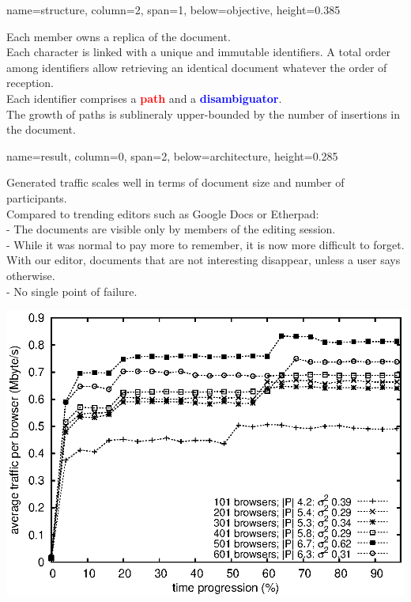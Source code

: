 \documentclass[a1paper, fontscale=0.38, portrait]{baposter}
\newcommand{\RED}[1]{\textcolor{red}{\textbf{#1}}}
\newcommand{\BLUE}[1]{\textcolor{blue}{\textbf{#1}}}
\newcommand{\SECONDROW}{0.385}
\newcommand{\THIRDROW}{0.285}
\begin{document}
\begin{poster}
{  }

  {name=structure, column=2, span=1, below=objective, height=\SECONDROW}{
    \begin{center}
      
    \end{center}
    Each member owns a replica of the document.\\
    Each character is linked with a unique and immutable identifiers. A total
    order among identifiers allow retrieving an identical document whatever the
    order of reception.\\
    Each identifier comprises a \RED{path} and a \BLUE{disambiguator}. \\
    The growth of paths is sublineraly upper-bounded by the number of insertions in
    the document.   
}

  {name=result, column=0, span=2, below=architecture, height=\THIRDROW}{
    \begin{minipage}[c]{.5\linewidth}
      Generated traffic scales well in terms of document size and number of
      participants.\\
                  
      Compared to trending editors such as Google Docs or Etherpad:\\
      - The documents are visible only by members of the editing session.\\
      - While it was normal to pay more to remember, it is now more difficult to
      forget. With our editor, documents that are not interesting disappear,
      unless a user says otherwise.\\
      - No single point of failure. \\
     
    \end{minipage} \hfill
    \begin{minipage}[c]{.5\linewidth}
      \centering
      \includegraphics[scale=0.5]{img/traffic.eps}
    \end{minipage}

}
\end{poster}
\end{document}
